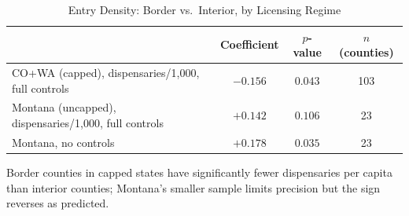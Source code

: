 \begin{table}[htbp]
\centering
\caption{Entry Density: Border vs.\ Interior, by Licensing Regime}
\label{tab:entry_density_mechanism}
\small
\begin{tabular}{lccc}
\toprule
& Coefficient & $p$-value & $n$ (counties) \\
\midrule
CO+WA (capped), dispensaries/1,000, full controls & $-0.156$ & $0.043$ & 103 \\
Montana (uncapped), dispensaries/1,000, full controls & $+0.142$ & $0.106$ & 23 \\
\quad Montana, no controls & $+0.178$ & $0.035$ & 23 \\
\bottomrule
\end{tabular}
\begin{minipage}{0.95\textwidth}
\vspace{0.2em}
\footnotesize Border counties in capped states have significantly fewer dispensaries per capita than
interior counties; Montana's smaller sample limits precision but the sign reverses as predicted.
\end{minipage}
\end{table}
